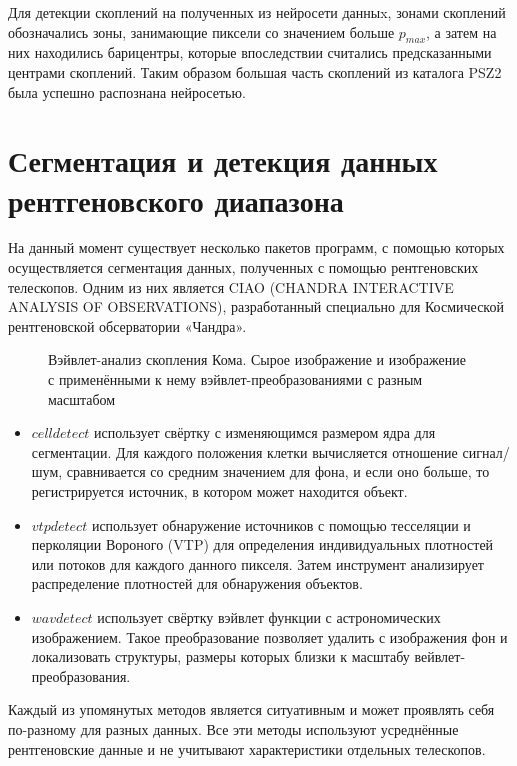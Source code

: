 Для детекции скоплений на полученных из нейросети данныx, зонами скоплений обозначались зоны, 
занимающие пиксели со значением больше $p_{max}$, а затем на них находились барицентры, которые 
впоследствии считались предсказанными центрами скоплений. Таким образом большая часть скоплений из 
каталога PSZ2 была успешно распознана нейросетью. \\

\section{Сегментация и детекция данных рентгеновского диапазона}

На данный момент существует несколько пакетов программ, с помощью которых осуществляется 
сегментация данных, полученных с помощью рентгеновских телескопов. Одним из них является CIAO 
(CHANDRA INTERACTIVE ANALYSIS OF OBSERVATIONS), разработанный специально для Космической 
рентгеновской обсерватории «Чандра». \\

\begin{figure}[h]
    \caption{Вэйвлет-анализ скопления Кома. Сырое изображение и изображение с применёнными 
        к нему вэйвлет-преобразованиями с разным масштабом \cite{Vikhlinin}}
\end{figure}

\begin{itemize}
    \item $celldetect$ использует свёртку с изменяющимся размером ядра для сегментации. Для каждого
        положения клетки вычисляется отношение сигнал/шум, сравнивается со средним значением для 
        фона, и если оно больше, то регистрируется источник, в котором может находится объект.
    \item $vtpdetect$ использует обнаружение источников с помощью тесселяции и перколяции Вороного 
        (VTP) для определения индивидуальных плотностей или потоков для каждого данного пикселя. 
        Затем инструмент анализирует распределение плотностей для обнаружения объектов.
    \item $wavdetect$ использует свёртку вэйвлет функции с астрономических изображением. Такое 
		преобразование позволяет удалить с изображения фон и локализовать структуры, размеры 
		которых близки к масштабу вейвлет-преобразования.
\end{itemize}

Каждый из упомянутых методов является ситуативным и может проявлять себя по-разному для разных 
данных. Все эти методы используют усреднённые рентгеновские данные и не учитывают характеристики 
отдельных телескопов.\\

